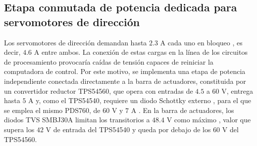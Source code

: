 \documentclass[../../General.tex]{subfiles}
\begin{document}

\subsection{Etapa conmutada de potencia dedicada para servomotores de dirección}

Los servomotores de dirección demandan hasta $2.3\text{ A}$ cada uno en bloqueo \citep{dsservo_rds3225}, es decir, $4.6\text{ A}$ entre ambos. La conexión de estas cargas en la línea de los circuitos de procesamiento provocaría caídas de tensión capaces de reiniciar la computadora de control. Por este motivo, se implementa una etapa de potencia independiente conectada directamente a la barra de actuadores, constituida por un convertidor reductor TPS54560, que opera con entradas de $4.5$ a $60\text{ V}$, entrega hasta $5\text{ A}$ y, como el TPS54540, requiere un diodo Schottky externo \citep{ti_tps54560}, para el que se emplea el mismo PDS760, de $60\text{ V}$ y $7\text{ A}$ \citep{diodes_pds760}. En la barra de actuadores, los diodos TVS SMBJ30A limitan los transitorios a $48.4\text{ V}$ como máximo \citep{vishay_smbj}, valor que supera los $42\text{ V}$ de entrada del TPS54540 \citep{ti_tps54540} y queda por debajo de los $60\text{ V}$ del TPS54560.
\end{document}
